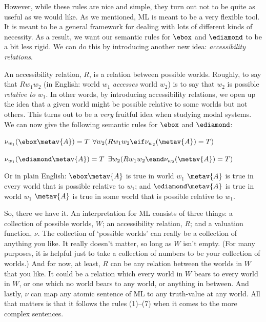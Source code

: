 However, while these rules are nice and simple, they turn out not to be quite as useful as we would like. As we mentioned, ML is meant to be a very flexible tool. It is meant to be a general framework for dealing with lots of different kinds of necessity. As a result, we want our semantic rules for $\ebox$ and $\ediamond$ to be a bit less rigid. We can do this by introducing another new idea: \emph{accessibility relations}.

An accessibility relation, $R$, is a relation between possible worlds. Roughly, to say that $Rw_1w_2$ (in English: world $w_1$ \emph{accesses} world $w_2$) is to say that $w_2$ is possible \emph{relative to} $w_1$. In other words, by introducing accessibility relations, we open up the idea that a given world might be possible relative to some worlds but not others. This turns out to be a \emph{very} fruitful idea when studying modal systems. We can now give the following semantic rules for $\ebox$ and $\ediamond$:
\begin{compactlist}[resume]
	\item $\nu_{w_1}(\ebox \metav{A})=T$ \ifeff{} $\forall w_2 (Rw_1w_2\eif \nu_{w_2}(\metav{A})=T)$
	\item $\nu_{w_1}(\ediamond \metav{A})=T$ \ifeff{} $\exists w_2 (Rw_1w_2\eand \nu_{w_2}(\metav{A})=T)$
\end{compactlist}
Or in plain English: $\ebox\metav{A}$ is true in world $w_1$ \ifeff{} $\metav{A}$ is true in every world that is possible relative to $w_1$; and $\ediamond\metav{A}$ is true in world $w_1$ \ifeff{} $\metav{A}$ is true in some world that is possible relative to $w_1$.

So, there we have it. An interpretation for ML consists of three things: a collection of possible worlds, $W$; an accessibility relation, $R$; and a valuation function, $\nu$. The collection of `possible worlds' can really be a collection of anything you like. It really doesn't matter, so long as $W$ isn't empty. (For many purposes, it is helpful just to take a collection of numbers to be your collection of worlds.) And for now, at least, $R$ can be any relation between the worlds in $W$ that you like. It could be a relation which every world in $W$ bears to every world in $W$, or one which no world bears to any world, or anything in between. And lastly, $\nu$ can map any atomic sentence of ML to any truth-value at any world. All that matters is that it follows the rules (1)--(7) when it comes to the more complex sentences.

